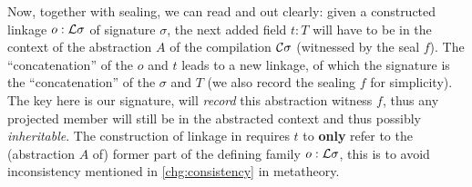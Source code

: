Now, together with sealing, we can read  and
 out clearly: given a constructed linkage $o : {\mathcal{L}}\sigma$
of signature $\sigma$, the next added field $t : T$ will have
to be in the context of the abstraction $A$
of the compilation ${\mathcal{C}}\sigma$ (witnessed by the seal $f$).
The ``concatenation'' of the
$o$ and $t$ leads to a new linkage, of which the signature is the
``concatenation'' of the $\sigma$ and $T$ (we also record the sealing
$f$ for simplicity). The key here is our signature, will \textit{record}
this abstraction witness $f$,
thus any projected member will still be in
the abstracted context and thus possibly \textit{inheritable}.  The
construction of linkage in  requires $t$ to
\textbf{only} refer to the (abstraction $A$ of) former part of the
defining family $o : {\mathcal{L}}\sigma$, this is to avoid inconsistency
mentioned in \ref{chg:consistency} in metatheory.

